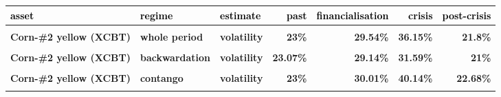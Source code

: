 \documentclass[
  authoryear,
  preprint,
  3p]{elsarticle}
\begin{document}
\begin{longtable}[t]{>{}l>{}l>{}l>{}r>{}r>{}r>{}r}
\toprule
\textcolor{black}{\textbf{asset}} & \textcolor{black}{\textbf{regime}} & \textcolor{black}{\textbf{estimate}} & \textcolor{black}{\textbf{past}} & \textcolor{black}{\textbf{financialisation}} & \textcolor{black}{\textbf{crisis}} & \textcolor{black}{\textbf{post-crisis}}\\
\midrule
\textbf{\cellcolor{gray!10}{Corn-\#2 yellow (XCBT)}} & \textbf{\cellcolor{gray!10}{whole period}} & \textbf{\cellcolor{gray!10}{mean}} & \textcolor[HTML]{4285f4}{\textbf{\cellcolor{gray!10}{3.48\%}}} & \textcolor[HTML]{4285f4}{\textbf{\cellcolor{gray!10}{21.37\%}}} & \textcolor[HTML]{4285f4}{\textbf{\cellcolor{gray!10}{6.89\%}}} & \textcolor[HTML]{4285f4}{\textbf{\cellcolor{gray!10}{-4.51\%}}}\\
\textbf{Corn-\#2 yellow (XCBT)} & \textbf{whole period} & \textbf{volatility} & \textcolor[HTML]{4285f4}{\textbf{23\%}} & \textcolor[HTML]{4285f4}{\textbf{29.54\%}} & \textcolor[HTML]{4285f4}{\textbf{36.15\%}} & \textcolor[HTML]{4285f4}{\textbf{21.8\%}}\\
\textbf{\cellcolor{gray!10}{Corn-\#2 yellow (XCBT)}} & \textbf{\cellcolor{gray!10}{backwardation}} & \textbf{\cellcolor{gray!10}{mean}} & \textcolor[HTML]{4285f4}{\textbf{\cellcolor{gray!10}{-4.86\%}}} & \textcolor[HTML]{4285f4}{\textbf{\cellcolor{gray!10}{19.26\%}}} & \textcolor[HTML]{4285f4}{\textbf{\cellcolor{gray!10}{20.48\%}}} & \textcolor[HTML]{4285f4}{\textbf{\cellcolor{gray!10}{-8.74\%}}}\\
\textbf{Corn-\#2 yellow (XCBT)} & \textbf{backwardation} & \textbf{volatility} & \textcolor[HTML]{4285f4}{\textbf{23.07\%}} & \textcolor[HTML]{4285f4}{\textbf{29.14\%}} & \textcolor[HTML]{4285f4}{\textbf{31.59\%}} & \textcolor[HTML]{4285f4}{\textbf{21\%}}\\
\textbf{\cellcolor{gray!10}{Corn-\#2 yellow (XCBT)}} & \textbf{\cellcolor{gray!10}{contango}} & \textbf{\cellcolor{gray!10}{mean}} & \textcolor[HTML]{4285f4}{\textbf{\cellcolor{gray!10}{11.3\%}}} & \textcolor[HTML]{4285f4}{\textbf{\cellcolor{gray!10}{23.54\%}}} & \textcolor[HTML]{4285f4}{\textbf{\cellcolor{gray!10}{-4.43\%}}} & \textcolor[HTML]{4285f4}{\textbf{\cellcolor{gray!10}{0.78\%}}}\\
\addlinespace
\textbf{Corn-\#2 yellow (XCBT)} & \textbf{contango} & \textbf{volatility} & \textcolor[HTML]{4285f4}{\textbf{23\%}} & \textcolor[HTML]{4285f4}{\textbf{30.01\%}} & \textcolor[HTML]{4285f4}{\textbf{40.14\%}} & \textcolor[HTML]{4285f4}{\textbf{22.68\%}}\\
\textbf{\cellcolor{gray!10}{Oats (XCBT)}} & \textbf{\cellcolor{gray!10}{whole period}} & \textbf{\cellcolor{gray!10}{mean}} & \textcolor[HTML]{4285f4}{\textbf{\cellcolor{gray!10}{5.49\%}}} & \textcolor[HTML]{4285f4}{\textbf{\cellcolor{gray!10}{21.62\%}}} & \textcolor[HTML]{4285f4}{\textbf{\cellcolor{gray!10}{8.89\%}}} & \textcolor[HTML]{4285f4}{\textbf{\cellcolor{gray!10}{-0.87\%}}}\\

\end{longtable}
\end{document}
